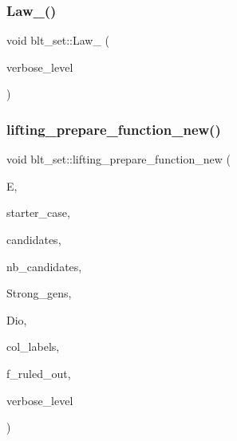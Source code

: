 \mbox{\label{classblt__set_afbcce98baadca785326b61dbe9434938}} 
\subsubsection{\texorpdfstring{Law\+\_()}{Law\_71()}}
{\footnotesize\ttfamily void blt\+\_\+set\+::\+Law\+\_ (\begin{DoxyParamCaption}\item[{\mbox{\hyperlink{galois_8h_a09fddde158a3a20bd2dcadb609de11dc}{I\+NT}}}]{verbose\+\_\+level }\end{DoxyParamCaption})}

\mbox{\label{classblt__set_a1314b7c0a3b78ba54c0f61a397d8afce}} 
\subsubsection{\texorpdfstring{lifting\+\_\+prepare\+\_\+function\+\_\+new()}{lifting\_prepare\_function\_new()}}
{\footnotesize\ttfamily void blt\+\_\+set\+::lifting\+\_\+prepare\+\_\+function\+\_\+new (\begin{DoxyParamCaption}\item[{\mbox{\hyperlink{classexact__cover}{exact\+\_\+cover}} $\ast$}]{E,  }\item[{\mbox{\hyperlink{galois_8h_a09fddde158a3a20bd2dcadb609de11dc}{I\+NT}}}]{starter\+\_\+case,  }\item[{\mbox{\hyperlink{galois_8h_a09fddde158a3a20bd2dcadb609de11dc}{I\+NT}} $\ast$}]{candidates,  }\item[{\mbox{\hyperlink{galois_8h_a09fddde158a3a20bd2dcadb609de11dc}{I\+NT}}}]{nb\+\_\+candidates,  }\item[{\mbox{\hyperlink{classstrong__generators}{strong\+\_\+generators}} $\ast$}]{Strong\+\_\+gens,  }\item[{\mbox{\hyperlink{classdiophant}{diophant}} $\ast$\&}]{Dio,  }\item[{\mbox{\hyperlink{galois_8h_a09fddde158a3a20bd2dcadb609de11dc}{I\+NT}} $\ast$\&}]{col\+\_\+labels,  }\item[{\mbox{\hyperlink{galois_8h_a09fddde158a3a20bd2dcadb609de11dc}{I\+NT}} \&}]{f\+\_\+ruled\+\_\+out,  }\item[{\mbox{\hyperlink{galois_8h_a09fddde158a3a20bd2dcadb609de11dc}{I\+NT}}}]{verbose\+\_\+level }\end{DoxyParamCaption})}

